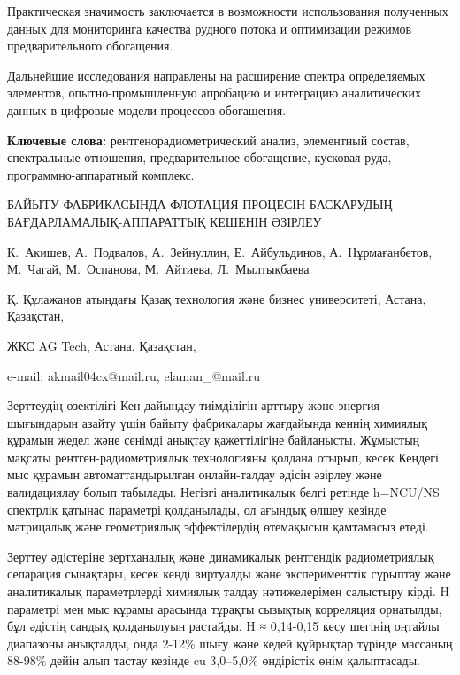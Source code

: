Практическая значимость заключается в возможности использования
полученных данных для мониторинга качества рудного потока и оптимизации
режимов предварительного обогащения.

Дальнейшие исследования направлены на расширение спектра определяемых
элементов, опытно-промышленную апробацию и интеграцию аналитических
данных в цифровые модели процессов обогащения.

{\bfseries Ключевые слова:} рентгенорадиометрический анализ, элементный
состав, спектральные отношения, предварительное обогащение, кусковая
руда, программно-аппаратный комплекс.

\begin{header}
БАЙЫТУ ФАБРИКАСЫНДА ФЛОТАЦИЯ ПРОЦЕСІН БАСҚАРУДЫҢ БАҒДАРЛАМАЛЫҚ-АППАРАТТЫҚ КЕШЕНІН ӘЗІРЛЕУ

К.~Акишев\envelope,
А.~Подвалов,
А.~Зейнуллин,
Е.~Айбульдинов\envelope,
А.~Нұрмағанбетов,
М.~Чагай,
М.~Оспанова,
М.~Айтиева,
Л.~Мылтықбаева
\end{header}

\begin{affil}
Қ. Құлажанов атындағы Қазақ технология және бизнес университеті, Астана, Қазақстан,

ЖКС AG Tech, Астана, Қазақстан,

e-mail: akmail04cx@mail.ru, elaman\_@mail.ru
\end{affil}

Зерттеудің өзектілігі Кен дайындау тиімділігін арттыру және энергия
шығындарын азайту үшін байыту фабрикалары жағдайында кеннің химиялық
құрамын жедел және сенімді анықтау қажеттілігіне байланысты. Жұмыстың
мақсаты рентген-радиометриялық технологияны қолдана отырып, кесек
Кендегі мыс құрамын автоматтандырылған онлайн-талдау әдісін әзірлеу және
валидациялау болып табылады. Негізгі аналитикалық белгі ретінде h=NCU/NS
спектрлік қатынас параметрі қолданылады, ол ағындық өлшеу кезінде
матрицалық және геометриялық эффектілердің өтемақысын қамтамасыз етеді.

Зерттеу әдістеріне зертханалық және динамикалық рентгендік
радиометриялық сепарация сынақтары, кесек кенді виртуалды және
эксперименттік сұрыптау және аналитикалық параметрлерді химиялық талдау
нәтижелерімен салыстыру кірді. H параметрі мен мыс құрамы арасында
тұрақты сызықтық корреляция орнатылды, бұл әдістің сандық қолданылуын
растайды. H ≈ 0,14-0,15 кесу шегінің оңтайлы диапазоны анықталды, онда
2-12\% шығу және кедей құйрықтар түрінде массаның 88-98\% дейін алып
тастау кезінде cu 3,0--5,0\% өндірістік өнім қалыптасады.

